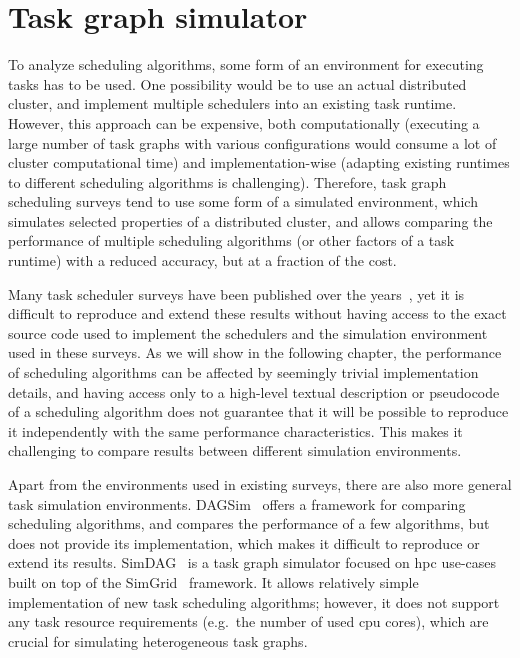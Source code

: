 \section{Task graph simulator}
\label{sec:estee-simulator}
To analyze scheduling algorithms, some form of an environment for executing tasks has to be used.
One possibility would be to use an actual distributed cluster, and implement multiple schedulers
into an existing task runtime. However, this approach can be expensive, both computationally
(executing a large number of task graphs with various configurations would consume a lot of cluster
computational time) and implementation-wise (adapting existing runtimes to different scheduling
algorithms is challenging). Therefore, task graph scheduling surveys tend to use some form of a
simulated environment, which simulates selected properties of a distributed cluster, and allows
comparing the performance of multiple scheduling algorithms (or other factors of a task runtime)
with a reduced accuracy, but at a fraction of the cost.

Many task scheduler surveys have been published over the years~\cite{hlfet1974, kwok1998benchmarking, hagras2003static, sinnen2005, wang2018list}, yet it is
difficult to reproduce and extend these results without having access to the exact source code used
to implement the schedulers and the simulation environment used in these surveys. As we will show
in the following chapter, the performance of scheduling algorithms can be affected by seemingly
trivial implementation details, and having access only to a high-level textual description or
pseudocode of a scheduling algorithm does not guarantee that it will be possible to reproduce it
independently with the same performance characteristics. This makes it challenging to compare
results between different simulation environments.

Apart from the environments used in existing surveys, there are also more general task simulation
environments. DAGSim~\cite{dagsim} offers a framework for comparing scheduling algorithms,
and compares the performance of a few algorithms, but does not provide its implementation, which
makes it difficult to reproduce or extend its results. SimDAG~\cite{simdag} is a task
graph simulator focused on \gls{hpc} use-cases built on top of the
SimGrid~\cite{simgrid} framework. It allows relatively simple implementation of new task
scheduling algorithms; however, it does not support any task resource requirements (e.g.\ the
number of used \gls{cpu} cores), which are crucial for simulating heterogeneous task
graphs.


